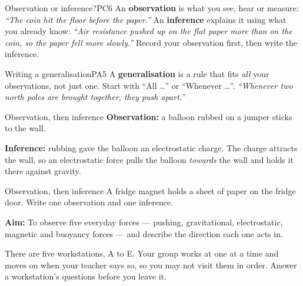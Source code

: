 
\begin{technique}{Observation or inference?}{PC6}
An \textbf{observation} is what you see, hear or measure: \emph{``The coin hit the floor before the paper.''} An \textbf{inference} explains it using what you already know: \emph{``Air resistance pushed up on the flat paper more than on the coin, so the paper fell more slowly.''} Record your observation first, then write the inference.
\end{technique}

\begin{technique}{Writing a generalisation}{PA5}
A \textbf{generalisation} is a rule that fits \emph{all} your observations, not just one. Start with ``All \dots'' or ``Whenever \dots''. \emph{``Whenever two north poles are brought together, they push apart.''}
\end{technique}

\begin{workedex}{Observation, then inference}
\textbf{Observation:} a balloon rubbed on a jumper sticks to the wall.

\smallskip
\textbf{Inference:} rubbing gave the balloon an electrostatic charge. The charge attracts the wall, so an electrostatic force pulls the balloon \emph{towards} the wall and holds it there against gravity.
\end{workedex}

\begin{wedo}{Observation, then inference}
A fridge magnet holds a sheet of paper on the fridge door. Write one observation and one inference.
\end{wedo}


\textbf{Aim:} To observe five everyday forces --- pushing, gravitational, electrostatic, magnetic and buoyancy forces --- and describe the direction each one acts in.

\smallskip
There are five workstations, A to E. Your group works at one at a time and moves on when your teacher says so, so you may not visit them in order. Answer a workstation's questions before you leave it.


